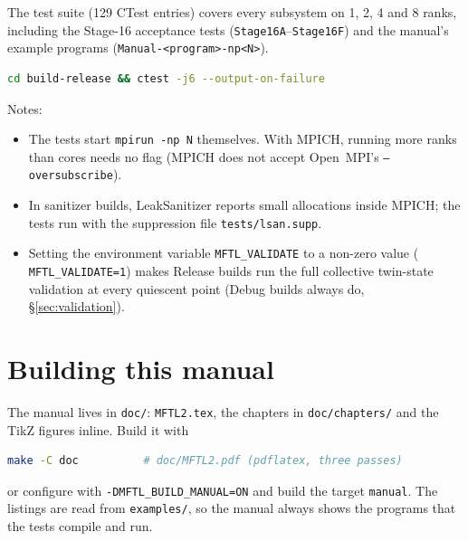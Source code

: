 The test suite (129 CTest entries) covers every subsystem on 1, 2, 4 and 8 ranks, including
the Stage-16 acceptance tests (\texttt{Stage16A}--\texttt{Stage16F}) and the manual's example
programs (\texttt{Manual-<program>-np<N>}).
\begin{lstlisting}[language=bash,numbers=none]
cd build-release && ctest -j6 --output-on-failure
\end{lstlisting}
Notes:
\begin{itemize}
  \item The tests start \texttt{mpirun -np N} themselves. With MPICH, running more ranks than
    cores needs no flag (MPICH does not accept Open~MPI's \texttt{--oversubscribe}).
  \item In sanitizer builds, LeakSanitizer reports small allocations inside MPICH; the tests run
    with the suppression file \texttt{tests/lsan.supp}.
  \item Setting the environment variable \texttt{MFTL\_VALIDATE} to a non-zero value (\eg
    \texttt{MFTL\_VALIDATE=1}) makes Release builds run the
    full collective twin-state validation at every quiescent point (Debug builds always do,
    \S\ref{sec:validation}).
\end{itemize}

\section{Building this manual}

The manual lives in \texttt{doc/}: \texttt{MFTL2.tex}, the chapters in \texttt{doc/chapters/}
and the TikZ figures inline. Build it with
\begin{lstlisting}[language=bash,numbers=none]
make -C doc          # doc/MFTL2.pdf (pdflatex, three passes)
\end{lstlisting}
or configure with \texttt{-DMFTL\_BUILD\_MANUAL=ON} and build the target \texttt{manual}. The
listings are read from \texttt{examples/}, so the manual always shows the programs that the
tests compile and run.
